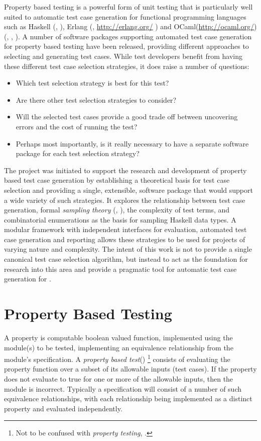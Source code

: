 Property based testing is a powerful form of unit testing that is
particularly well suited to automatic test case generation for functional programming languages
such as Haskell (\cite{Haskell98}, \cite{Haskell2010}),
Erlang (\cite{armstrong1993Erlang}, \url{http://erlang.org/} ) and OCaml(\url{http://ocaml.org/})
(\cite{Fink1997}, \cite{Papadakis2011}, \cite{OSullivan2008}).
A number of software packages supporting
automated test case generation for property based testing have been released,
providing different approaches to selecting and generating test cases.
While test developers benefit from having
these different test case selection strategies,
it does raise a number of questions:
\begin{itemize}
\item Which test selection strategy is best for this test?
\item Are there other test selection strategies to consider?
\item Will the selected test cases provide a good trade off between uncovering errors and the cost of running the test?
\item Perhaps most importantly,
is it really necessary to have a separate software package
for each test selection strategy?
\end{itemize}

The \GC project was initiated to 
support the research and development of property based test case generation
by establishing a theoretical basis for test case selection and
providing a single, extensible, software package that 
would support a wide variety of such strategies.
It explores the relationship between test case generation,
formal \emph{sampling theory} (\cite{Stuart1968}, \cite{Cochran1977}),
the complexity of test terms,
and combinatorial enumerations as the basis for sampling Haskell data types.
A modular framework with independent interfaces for 
evaluation,  automated test case generation and reporting
allows these strategies to be used for 
projects of varying nature and complexity.
The intent of this work is not to provide a single canonical test case selection algorithm,
but instead to act as the foundation for research into this area
and provide a pragmatic tool for automatic test case generation for \pbt.

\section{Property Based Testing}
A property is computable boolean valued function,
implemented using the module(s) to be tested,
implementing an equivalence relationship  from the module's specification.
A \emph{property based test}(\pbt)%
\footnote{Not to be confused with \emph{property testing}, \cite{Ron00}.}
consists of evaluating the property function
over a subset of its allowable inputs (test cases).
If the property does not evaluate to true for one or more of the allowable inputs,
then the module is incorrect.
Typically a specification will consist of a number of such equivalence relationships,
with each relationship being implemented as a distinct property and evaluated independently.

